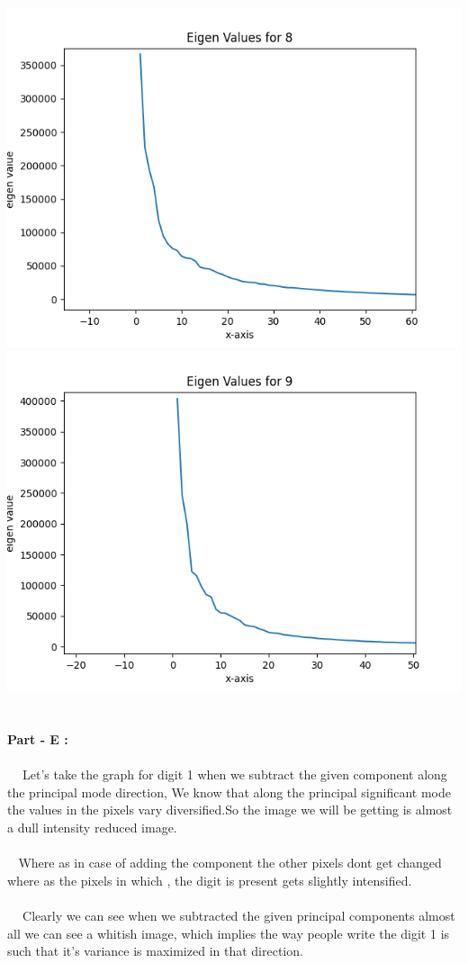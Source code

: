 \documentclass{article}
\begin{document}
    \\
    \includegraphics[scale=.5]{../results/q4/eigen_plots/8_eigen_value.png}
    \includegraphics[scale=.5]{../results/q4/eigen_plots/9_eigen_value.png}
    \\ \\ \\
    \textbf{Part - E :} \\ \\
    $~~~~$ Let's take the graph for digit 1 when we subtract the given component along the principal mode direction,
    We know that along the principal significant mode the values in the pixels vary diversified.So the image we will be getting is almost a dull 
    intensity reduced image.
    \\ \\ 
    $~~~~$Where as in case of adding the component the other pixels dont get changed where as the pixels in which
    , the digit is present gets slightly intensified. 
    \\ \\
    $~~~~$ Clearly we can see when we subtracted the given principal components almost all we can see a whitish image,
    which implies the way people write the digit 1 is such that it's variance is maximized in that direction.
    \\ \\ \\
\end{document}
